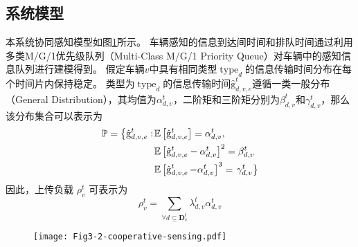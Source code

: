 \subsection{系统模型}
本系统协同感知模型如图\ref{fig 3-2}所示。
车辆感知的信息到达间时间和排队时间通过利用多类M/G/1优先级队列（Multi-Class M/G/1 Priority Queue）\cite{qian2020minimizing}对车辆中的感知信息队列进行建模得到。
假定车辆$v$中具有相同类型$\operatorname{type}_d$的信息传输时间分布在每个时间片内保持稳定。
类型为$\operatorname{type}_d$的信息传输时间$\operatorname{\hat{g}}_{d, v, e}^t$遵循一类一般分布（General Distribution），其均值为$\alpha_{d, v}^t$，二阶矩和三阶矩分别为$\beta_{d, v}^t$和$\gamma_{d, v}^t$，那么该分布集合可以表示为
\begin{align}
	\mathbb{P}=\left\{\hat{\mathrm{g}}_{d, v, e}^t:\right. & \mathbb{E}\left[\hat{\mathrm{g}}_{d, v, e}^t\right]=\alpha_{d, v}^t, \notag \\
	& \mathbb{E}\left[\hat{\mathrm{g}}_{d, v, e}^t-\alpha_{d, v}^t\right]^2=\beta_{d, v}^t \notag \\
	& \mathbb{E}\left[\operatorname{\hat{g}}_{d, v, e}^t-\alpha_{d, v}^t\right]^{3}=\left.\gamma_{d, v}^t \right\}
\end{align}
因此，上传负载 $\rho_{v}^{t}$ 可表示为 
\begin{equation}
    \rho_{v}^{t}=\sum_{\forall d \subseteq \mathbf{D}_v^t} \lambda_{d,v}^{t}  \alpha_{d, v}^t
\end{equation}

\begin{figure}[h]
\centering
  \texttt{[image: Fig3-2-cooperative-sensing.pdf]}
  \label{fig 3-2}
\end{figure}

